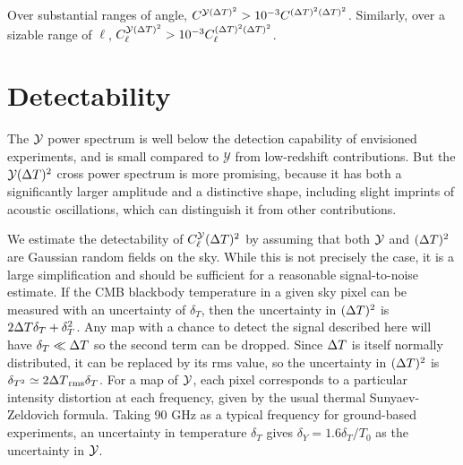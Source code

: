 \documentclass[fleqn,usenatbib]{mnras}
\begin{document}
    Over substantial ranges of angle, $C^{\mathcal{Y}({\Delta T})^2}>
    10^{-3}C^{({\Delta T})^2({\Delta T})^2}$.  Similarly, over a sizable range of
    $\ell$, $C_\ell^{\mathcal{Y}({\Delta T})^2} > 10^{-3}C_\ell^{(\Delta T)^2({\Delta T})^2}$.


\section{Detectability} \label{sec:detectability}

    The $\mathcal{Y}$ power spectrum is well below the detection capability of
    envisioned experiments, and is small compared to $\mathcal Y$ from
    low-redshift contributions.  But the ${\mathcal{Y}}({\Delta T})^2$ cross power
    spectrum is more promising, because it has both a significantly larger
    amplitude and a distinctive shape, including slight imprints of acoustic
    oscillations, which can distinguish it from other contributions.

    We estimate the detectability of $C_\ell^{\mathcal{Y}}({\Delta T})^2$ by assuming that
    both $\mathcal{Y}$ and $({\Delta T})^2$ are Gaussian random fields on the sky.  While
    this is not precisely the case, it is a large simplification and should be
    sufficient for a reasonable signal-to-noise estimate.  If the CMB blackbody
    temperature in a given sky pixel can be measured with an uncertainty of
    $\delta_T$, then the uncertainty in $({\Delta T})^2$ is $2{\Delta T}\delta_T +
    \delta_T^2$.  Any map with a chance to detect the signal described here will
    have $\delta_T \ll {\Delta T}$ so the second term can be dropped.  Since
    ${\Delta T}$ is itself normally distributed, it can be replaced by its rms
    value, so the uncertainty in $({\Delta T})^2$ is $\delta_{T^2} \simeq
    2{\Delta T}_{\rm rms}\delta_T$.  For a map of $\mathcal{Y}$, each pixel corresponds to
    a particular intensity distortion at each frequency, given by the usual
    thermal Sunyaev-Zeldovich formula.  Taking 90 GHz as a typical frequency for
    ground-based experiments, an uncertainty in temperature $\delta_T$ gives
    $\delta_Y = 1.6 \delta_T / T_0$ as the uncertainty in $\mathcal{Y}$.
\end{document}
